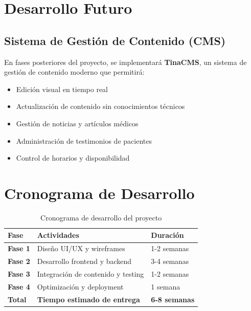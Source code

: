 \documentclass[12pt,a4paper]{article}
\begin{document}
\section{Desarrollo Futuro}

\subsection{Sistema de Gestión de Contenido (CMS)}
En fases posteriores del proyecto, se implementará \textbf{TinaCMS}, un sistema de gestión de contenido moderno que permitirá:

\begin{itemize}
    \item Edición visual en tiempo real
    \item Actualización de contenido sin conocimientos técnicos
    \item Gestión de noticias y artículos médicos
    \item Administración de testimonios de pacientes
    \item Control de horarios y disponibilidad
\end{itemize}


\section{Cronograma de Desarrollo}

\begin{table}[h]
\centering
\begin{tabularx}{\textwidth}{|l|X|l|}
\hline
\textbf{Fase} & \textbf{Actividades} & \textbf{Duración} \\
\hline
\textbf{Fase 1} & Diseño UI/UX y wireframes & 1-2 semanas \\
\hline
\textbf{Fase 2} & Desarrollo frontend y backend & 3-4 semanas \\
\hline
\textbf{Fase 3} & Integración de contenido y testing & 1-2 semanas \\
\hline
\textbf{Fase 4} & Optimización y deployment & 1 semana \\
\hline
\textbf{Total} & \textbf{Tiempo estimado de entrega} & \textbf{6-8 semanas} \\
\hline
\end{tabularx}
\caption{Cronograma de desarrollo del proyecto}
\end{table}
\end{document}
